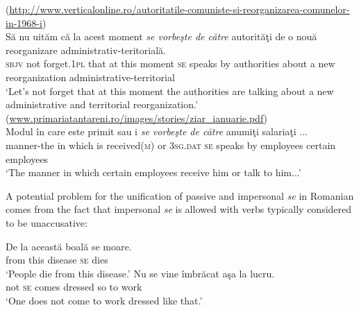 \documentclass[output=paper]{langsci/langscibook}
\begin{document}
\ea \label{ex:giurgea:10}
    \ea (\url{http://www.verticalonline.ro/autoritatile-comuniste-si-reorganizarea-comunelor-in-1968-i})\\
    \gll  Să    nu  uităm        că    la acest moment \emph{se vorbeşte de către}  autorităţi de    o nouă reorganizare administrativ-teritorială.\\
    {\textsc{sbjv} }{not forget.\textsc{1}}{\textsc{pl}}{ that at this   moment} {\textsc{se}}{ speaks   by          authorities about a} new  reorganization administrative-territorial\\
    \glt ‘Let’s not forget that at this moment the authorities are talking about a new administrative and territorial reorganization.’
    \ex (\url{www.primariatantareni.ro/images/stories/ziar\_ianuarie.pdf})\\
    \gll Modul        în care    este primit          sau i \emph{se vorbeşte de  către} anumiţi salariaţi ...\\
         manner-the in which is   received(\textsc{m})  or  \textsc{3sg}.\textsc{dat se} speaks    by employees certain  employees\\
    \glt ‘The manner in which certain employees receive him or talk to him...’
    \z
\z

A potential problem for the unification of passive and impersonal \textit{se} in Romanian comes from the fact that impersonal \textit{se} is allowed with verbs typically considered to be unaccusative:

\ea%
    \label{ex:giurgea:11}
    \ea
    \gll De la această boală    se  moare.\\
         from  this       disease \textsc{se} dies\\
    \glt ‘People die from this disease.’
    \ex
    \gll Nu se vine     îmbrăcat aşa la lucru.\\
         not \textsc{se} comes dressed  so   to work\\
    \glt ‘One does not come to work dressed like that.’
    \z
\z    
 
\end{document}
